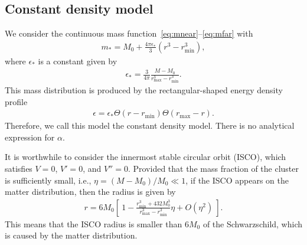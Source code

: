 \documentclass[aps,11pt,nofootinbib,preprintnumbers,groupedaddress,superscriptaddress]{revtex4-2}
\begin{document}
\subsection{Constant density model}
\label{sec:4A}
We consider the continuous mass function~\eqref{eq:mnear}--\eqref{eq:mfar} with 
\begin{align}
m_*=M_0+\frac{4\pi \epsilon_*}{3} (r^3-r_{\mathrm{min}}^3),
\end{align}
where $\epsilon_*$ is a constant given by
\begin{align}
\epsilon_*=\frac{3}{4\pi} \frac{M-M_0}{r_{\mathrm{max}}^3-r_{\mathrm{min}}^3}.
\end{align}
This mass distribution is produced by the rectangular-shaped energy density profile
\begin{align}
\epsilon=\epsilon_* \Theta(r-r_{\mathrm{min}})\Theta(r_{\mathrm{max}}-r).
\end{align}
Therefore, we call this model the constant density model.
There is no analytical expression for $\alpha$.


It is worthwhile to consider 
the innermost stable circular orbit (ISCO), which satisfies $V=0$, $V'=0$, and $V''=0$. 
Provided that the mass fraction of the cluster is sufficiently small, i.e., $\eta=(M-M_0)/M_0\ll1$,
if the ISCO appears on the matter distribution, then the radius is given by
\begin{align}
r=6M_0 \left[\:\!
1-\frac{r_{\mathrm{min}}^3+432 M_0^3}{r_{\mathrm{max}}^3-r_{\mathrm{min}}^3}
\eta
+O(\eta^2)
\:\!\right]. 
\end{align}
This means that the ISCO radius is smaller than $6M_0$ of the Schwarzschild, which is caused by the matter distribution.
\end{document}
